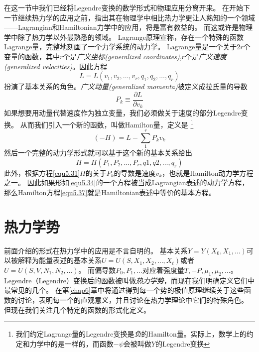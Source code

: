 在这一节中我们已经将Legendre变换的数学形式和物理应用分离开来。
在开始下一节继续热力学的应用之前，指出其在物理学中相比热力学更让人熟知的一个领域——Lagrangian和Hamiltonian力学中的应用，将是富有教益的。
而这或许是物理学中除了热力学以外最熟悉的领域。
Lagrange原理宣称，存在一个特殊的函数Lagrange量，完整地刻画了一个力学系统的动力学。
Lagrange量是一个关于$2r$个变量的函数，其中$r$个是{\it 广义坐标(generalized coordinates)},$r$个是{\it 广义速度(generalized velocities)}。因此方程
\begin{equation}
\label{equ5.34}
  L=L(v_1,v_2,\dots,v_r,q_1,q_2,\dots,q_r)
\end{equation}
扮演了基本关系的角色。{\it 广义动量(generalized momenta)}被定义成拉氏量的导数
\begin{equation}
\label{equ5.35}
	P_k \equiv \frac{\partial L}{\partial v_k}
\end{equation}
如果想要用动量代替速度作为独立变量，我们必须做关于速度的部分Legendre变换。
从而我们引入一个新的函数，叫做Hamilton量，定义是%
\footnote{我们约定Lagrange量的Legendre变换是{\it 负}的Hamilton量。实际上，数学上的约定和力学中的是一样的，而函数$-\psi$会被叫做$Y$的Legendre变换}%
\begin{equation}
\label{equ5.36}
  (-H)=L-\sum_1^rP_kv_k
\end{equation}
然后一个完整的动力学形式就可以基于这个新的基本关系给出
\begin{equation}
\label{equ5.37}
  H=H(P_1,P_2,\dots,P_r,q1,q2,\dots,q_r)
\end{equation}
此外，根据方程\eqref{equ5.31}$H$的关于$P_k$的导数是速度$v_k$，也就是Hamilton动力学方程之一。
因此如果形如\eqref{equ5.34}的一个方程被当成Lagrangian表述的动力学方程，那么Hamilton方程\eqref{equ5.37}就是Hamiltonian表述中等价的基本方程。



\section{热力学势}
\label{sec5.3}

前面介绍的形式在热力学中的应用是不言自明的。
基本关系$Y=Y(X_0,X_1,\dots)$可以被解释为能量表述的基本关系$U=U(S,X_1,X_2,\dots,X_t)$或者$U=U(S,V,N_1,N_2,\dots)$。
而偏导数$P_0,P_1,\dots$对应着强度量$T,-P,\mu_1,\mu_2,\dots$。
Legendre（Legendre）变换后的函数被叫做{\it 热力学势}，而现在我们明确定义它们中最常见的几个。
在第\ref{chap6}章中将通过得到每一个势的极值原理继续关于这些函数的讨论，表明每一个的直观意义，并且讨论在热力学理论中它们的特殊角色。
但现在我们关注几个特定的函数的形式化定义。

